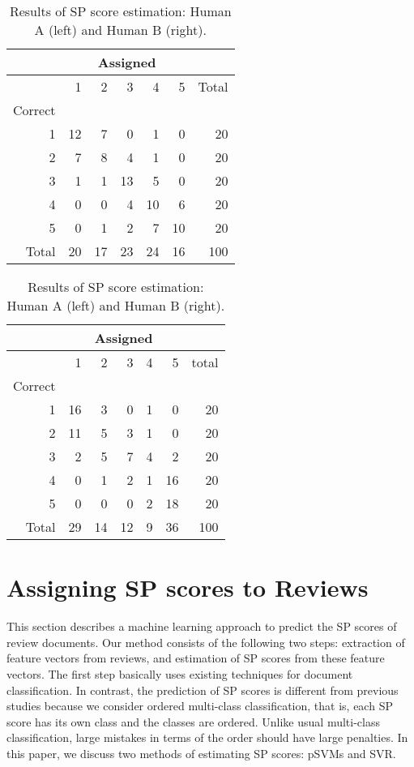\documentclass[japanese]{jnlp_1.3d}
\begin{document}
\begin{table}[t]
 \caption{Results of SP score estimation: Human A (left) and Human B (right).}
\label{humantest_a}
\begin{center}
  \begin{tabular}{|r|rrrrr|r|} \hline
            & \multicolumn{5}{|c|}{Assigned}&  \\ \hline
            & 1 & 2 & 3 & 4 & 5    & Total \\ \hline
  Correct  &   &   &   &   & & \\
  1                 & 12 & 7 & 0  & 1  & 0   & 20  \\
  2                 &  7 & 8 & 4  & 1  & 0   & 20  \\
  3                 &  1 & 1 & 13 & 5  & 0   & 20  \\
  4                 &  0 & 0 &  4 & 10 & 6   & 20  \\
  5                 &  0 & 1 &  2 & 7  & 10   & 20 \\ \hline
  Total             & 20 & 17 & 23 & 24 & 16 & 100 \\ \hline
  \end{tabular}
  \begin{tabular}{|r|rrrrr|r|} \hline
             & \multicolumn{5}{|c|}{Assigned}&  \\ \hline
             & 1  & 2 & 3  & 4  & 5   & total \\ \hline
  Correct    &    &   &    &    &     & \\
  1          & 16 & 3 & 0  & 1  & 0   & 20  \\
  2          & 11 & 5 & 3  & 1  & 0   & 20               \\
  3          &  2 & 5 & 7  & 4  & 2   & 20            \\
  4          &  0 & 1 & 2  & 1  & 16  & 20                   \\
  5          &  0 & 0 & 0  & 2  & 18  & 20 \\ \hline
  Total      & 29 & 14 & 12 & 9 & 36 & 100 \\ \hline
  \end{tabular}
  \end{center}
\end{table}


\section{Assigning SP scores to Reviews}
\label{method}

This section describes a machine learning approach to predict the SP scores of review documents. Our method consists of the following two steps: extraction of feature vectors from reviews, and estimation of SP scores from these feature vectors. The first step basically uses existing techniques for document classification. In contrast, the prediction of SP scores is different from previous studies because we consider ordered multi-class classification, that is, each SP score has its own class and the classes are ordered. Unlike usual multi-class classification, large mistakes in terms of the order should have large penalties.  In this paper, we discuss two methods of estimating SP scores: pSVMs and SVR.
\end{document}
